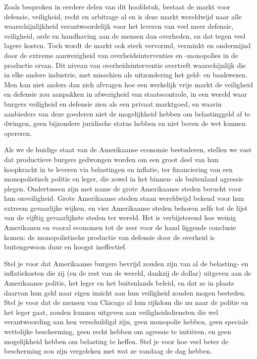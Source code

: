 Zoals besproken in eerdere delen van dit hoofdstuk, bestaat de markt voor defensie, veiligheid, recht en arbitrage al en is deze markt wereldwijd naar alle waarschijnlijkheid verantwoordelijk voor het leveren van veel meer defensie, veiligheid, orde en handhaving aan de mensen dan overheden, en dat tegen veel lagere kosten. Toch wordt de markt ook sterk vervormd, verminkt en ondermijnd door de extreme aanwezigheid van overheidsinterventies en -monopolies in de productie ervan. Dit niveau van overheidsinterventie overtreft waarschijnlijk die in elke andere industrie, met misschien als uitzondering het geld- en bankwezen. Men kan niet anders dan zich afvragen hoe een werkelijk vrije markt de veiligheid en defensie zou aanpakken in afwezigheid van staatscontrole, in een wereld waar burgers veiligheid en defensie zien als een privaat marktgoed, en waarin aanbieders van deze goederen niet de mogelijkheid hebben om belastinggeld af te dwingen, geen bijzondere juridische status hebben en niet boven de wet kunnen opereren.

Als we de huidige staat van de Amerikaanse economie bestuderen, stellen we vast dat productieve burgers gedwongen worden om een groot deel van hun koopkracht in te leveren via belastingen en inflatie, ter financiering van een monopolistisch politie en leger, die zowel in het binnen- als buitenland agressie plegen. Ondertussen zijn met name de grote Amerikaanse steden berucht voor hun onveiligheid. Grote Amerikaanse steden staan wereldwijd bekend voor hun extreem gevaarlijke wijken, en vier Amerikaanse steden behoren zelfs tot de lijst van de vijftig gevaarlijkste steden ter wereld.\autocite{210} Het is verbijsterend hoe weinig Amerikanen en vooral economen tot de zeer voor de hand liggende conclusie komen: de monopolistische productie van defensie door de overheid is buitengewoon duur en hoogst ineffectief.

Stel je voor dat Amerikaanse burgers bevrijd zouden zijn van al de belasting- en inflatiekosten die zij (en de rest van de wereld, dankzij de dollar) uitgeven aan de Amerikaanse politie, het leger en het buitenlands beleid, en dat ze in plaats daarvan hun geld naar eigen inzicht aan hun veiligheid zouden mogen besteden. Stel je voor dat de mensen van Chicago al hun rijkdom die nu naar de politie en het leger gaat, zouden kunnen uitgeven aan veiligheidsdiensten die wel verantwoording aan hen verschuldigd zijn, geen monopolie hebben, geen speciale wettelijke bescherming, geen recht hebben om agressie te initiëren, en geen mogelijkheid hebben om belasting te heffen. Stel je voor hoe veel beter de bescherming zou zijn vergeleken met wat ze vandaag de dag hebben.

